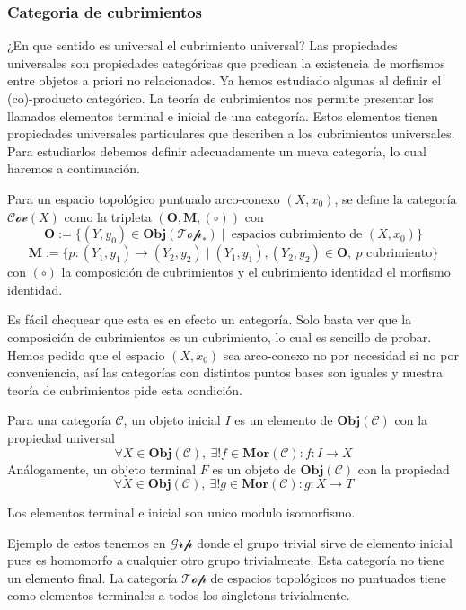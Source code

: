 \subsubsection{Categoria de cubrimientos}
¿En que sentido es universal el cubrimiento universal? Las propiedades
universales son propiedades categóricas que predican la existencia de
morfismos entre objetos a priori no relacionados. Ya hemos estudiado
algunas al definir el (co)-producto categórico. La teoría de cubrimientos
nos permite presentar los llamados elementos terminal e inicial de
una categoría. Estos elementos tienen propiedades universales
particulares que describen a los cubrimientos universales. Para
estudiarlos debemos definir adecuadamente un nueva categoría, lo cual
haremos a continuación.
\begin{definicion}
  Para un espacio topológico puntuado arco-conexo \((X,x_0)\), se define
  la categoría \(\mathscr{Cov}(X)\) como la tripleta \(\left( \mathbf O,
  \mathbf M, (\circ) \right)\) con
\[ \mathbf O := \{ (Y, y_0) \in \mathbf{Obj}(\mathscr{Top_*}) \mid
    \ \text{espacios cubrimiento de } (X, x_0) \}\]
\[ \mathbf M := \{ p : (Y_1, y_1) \to (Y_2, y_2) \mid (Y_1, y_1), (Y_2,
  y_2) \in \mathbf O ,\ p \text{ cubrimiento}\}\]
  con \((\circ)\) la composición de cubrimientos y el cubrimiento
  identidad el morfismo identidad.
\end{definicion}
Es fácil chequear que esta es en efecto un categoría. Solo basta ver
que la composición de cubrimientos es un cubrimiento, lo cual es
sencillo de probar. Hemos pedido que el espacio \((X, x_0)\) sea
arco-conexo no por necesidad si no por conveniencia, así las categorías
con distintos puntos bases son iguales y nuestra teoría de cubrimientos
pide esta condición.

\begin{definicion}
  Para una categoría \(\mathscr C\), un objeto inicial \(I\) es un
  elemento de \(\mathbf{Obj} (\mathscr C)\) con la propiedad universal
  \[ \forall X \in \mathbf{Obj}(\mathscr C),\ \exists ! f \in
    \mathbf{Mor} (\mathscr C) : f : I \to X \]
  Análogamente, un objeto terminal \(F\) es un objeto de
  \(\mathbf{Obj} (\mathscr C)\) con la propiedad
  \[ \forall X \in \mathbf{Obj}(\mathscr C),\ \exists ! g \in
    \mathbf{Mor} (\mathscr C) : g : X \to T \]
\end{definicion}
\begin{acotacion}
  Los elementos terminal e inicial son unico modulo isomorfismo.
\end{acotacion}
Ejemplo de estos tenemos en \(\mathscr{Grp}\) donde el grupo trivial
sirve de elemento inicial pues es homomorfo a cualquier otro grupo
trivialmente. Esta categoría no tiene un elemento final. La categoría
\(\mathscr {Top}\) de espacios topológicos no puntuados tiene como
elementos terminales a todos los singletons trivialmente.

